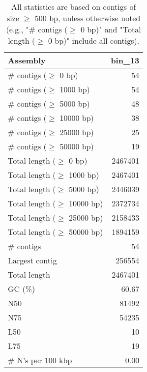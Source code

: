 \documentclass[12pt,a4paper]{article}
\begin{document}
\begin{table}[ht]
\begin{center}
\caption{All statistics are based on contigs of size $\geq$ 500 bp, unless otherwise noted (e.g., "\# contigs ($\geq$ 0 bp)" and "Total length ($\geq$ 0 bp)" include all contigs).}
\begin{tabular}{|l*{1}{|r}|}
\hline
Assembly & bin\_13 \\ \hline
\# contigs ($\geq$ 0 bp) & 54 \\ \hline
\# contigs ($\geq$ 1000 bp) & 54 \\ \hline
\# contigs ($\geq$ 5000 bp) & 48 \\ \hline
\# contigs ($\geq$ 10000 bp) & 38 \\ \hline
\# contigs ($\geq$ 25000 bp) & 25 \\ \hline
\# contigs ($\geq$ 50000 bp) & 19 \\ \hline
Total length ($\geq$ 0 bp) & 2467401 \\ \hline
Total length ($\geq$ 1000 bp) & 2467401 \\ \hline
Total length ($\geq$ 5000 bp) & 2446039 \\ \hline
Total length ($\geq$ 10000 bp) & 2372734 \\ \hline
Total length ($\geq$ 25000 bp) & 2158433 \\ \hline
Total length ($\geq$ 50000 bp) & 1894159 \\ \hline
\# contigs & 54 \\ \hline
Largest contig & 256554 \\ \hline
Total length & 2467401 \\ \hline
GC (\%) & 60.67 \\ \hline
N50 & 81492 \\ \hline
N75 & 54235 \\ \hline
L50 & 10 \\ \hline
L75 & 19 \\ \hline
\# N's per 100 kbp & 0.00 \\ \hline
\end{tabular}
\end{center}
\end{table}
\end{document}
